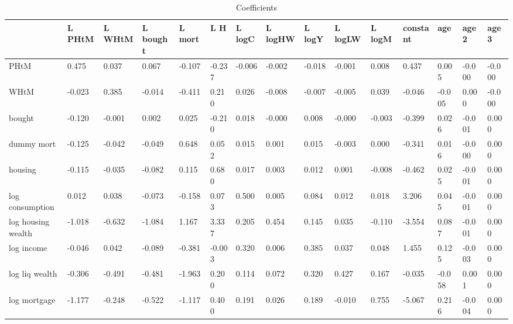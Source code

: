 \begin{table}[htbp]
\caption{\label{clabel} Coefficients}\centering\medskip
\begin{tabular}{lllllllllllllll} \hline \hline
 & L PHtM  & L WHtM  & L bought  & L mort  & L H  & L logC  & L logHW  & L logY  & L logLW  & L logM  & constant  & age  & age2  & age3  \\  \hline 
PHtM &     0.475 &     0.037 &     0.067 &    -0.107 &    -0.237 &    -0.006 &    -0.002 &    -0.018 &    -0.001 &     0.008 &     0.437 &     0.005 &    -0.000 &    -0.000 \\  
WHtM &    -0.023 &     0.385 &    -0.014 &    -0.411 &     0.210 &     0.026 &    -0.008 &    -0.007 &    -0.005 &     0.039 &    -0.046 &    -0.005 &     0.000 &    -0.000 \\  
bought &    -0.120 &    -0.001 &     0.002 &     0.025 &    -0.210 &     0.018 &    -0.000 &     0.008 &    -0.000 &    -0.003 &    -0.399 &     0.026 &    -0.001 &     0.000 \\  
dummy mort &    -0.125 &    -0.042 &    -0.049 &     0.648 &     0.052 &     0.015 &     0.001 &     0.015 &    -0.003 &     0.000 &    -0.341 &     0.016 &    -0.000 &     0.000 \\  
housing &    -0.115 &    -0.035 &    -0.082 &     0.115 &     0.680 &     0.017 &     0.003 &     0.012 &     0.001 &    -0.008 &    -0.462 &     0.025 &    -0.001 &     0.000 \\  
log consumption &     0.012 &     0.038 &    -0.073 &    -0.158 &     0.073 &     0.500 &     0.005 &     0.084 &     0.012 &     0.018 &     3.206 &     0.045 &    -0.001 &     0.000 \\  
log housing wealth &    -1.018 &    -0.632 &    -1.084 &     1.167 &     3.337 &     0.205 &     0.454 &     0.145 &     0.035 &    -0.110 &    -3.554 &     0.087 &    -0.001 &     0.000 \\  
log income &    -0.046 &     0.042 &    -0.089 &    -0.381 &    -0.003 &     0.320 &     0.006 &     0.385 &     0.037 &     0.048 &     1.455 &     0.125 &    -0.003 &     0.000 \\  
log liq wealth &    -0.306 &    -0.491 &    -0.481 &    -1.963 &     0.200 &     0.114 &     0.072 &     0.320 &     0.427 &     0.167 &    -0.035 &    -0.058 &     0.001 &     0.000 \\  
log mortgage &    -1.177 &    -0.248 &    -0.522 &    -1.117 &     0.400 &     0.191 &     0.026 &     0.189 &    -0.010 &     0.755 &    -5.067 &     0.216 &    -0.004 &     0.000 \\  
\hline \hline \end{tabular}
\end{table}
